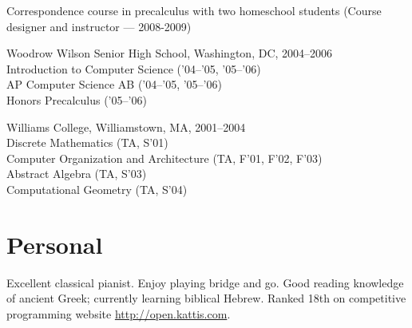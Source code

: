 \documentclass[12pt]{article}
\newcommand{\cvitem}{\par\hangpara{2em}{1}}
\begin{document}
\cvitem
Correspondence course in precalculus with two homeschool students
(Course designer and instructor --- 2008-2009)

\cvitem
Woodrow Wilson Senior High School, Washington, DC, 2004--2006 \\
Introduction to Computer Science ('04--'05, '05--'06) \\
AP Computer Science AB ('04--'05, '05--'06) \\
Honors Precalculus ('05--'06)

\cvitem
Williams College, Williamstown, MA, 2001--2004 \\
Discrete Mathematics (TA, S'01) \\
Computer Organization and Architecture (TA, F'01, F'02, F'03) \\
Abstract Algebra (TA, S'03) \\
Computational Geometry (TA, S'04) \\




\section*{Personal}

Excellent classical pianist.  Enjoy playing bridge and go.  Good
reading knowledge of ancient Greek; currently learning biblical
Hebrew.  Ranked 18th on competitive programming website
\url{http://open.kattis.com}.
\end{document}
